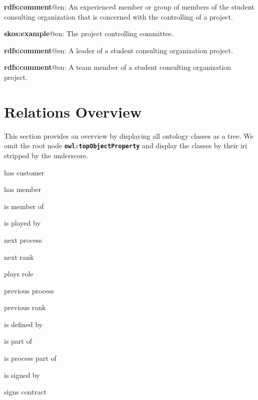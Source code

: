 \documentclass[a4paper, DIV=13, BCOR=0cm]{scrbook}
\newcommand{\class}[1]{\texttt{\textbf{#1}}}
\begin{document}
\begin{mdframed}[style=onto-3, frametitle={Project Controlling}]
	{%
		\begin{compactitem}
			\item \textbf{rdfs:comment}@en: An experienced member or group of members of the student consulting organization that is concerned with the controlling of a project.
			\item \textbf{skos:example}@en: The project controlling committee.
		\end{compactitem}
	} %
\end{mdframed}

\begin{mdframed}[style=onto-3, frametitle={Project Team Leader}]
	{%
		\begin{compactitem}
			\item \textbf{rdfs:comment}@en: A leader of a student consulting organization project.
		\end{compactitem}
	} %
\end{mdframed}

\begin{mdframed}[style=onto-3, frametitle={Project Team Member}]
	{%
		\begin{compactitem}
			\item \textbf{rdfs:comment}@en: A team member of a student consulting organization project.
		\end{compactitem}
	} %
\end{mdframed}


\section{Relations Overview}
This section provides an overview by displaying all ontology classes as a tree. We omit the root node \class{owl:topObjectProperty} and display the classes by their \gls{iri} stripped by the underscore.

\begin{compactitem}
	\item has customer
	\item has member
	\item is member of
	\item is played by
	\item next process
	\item next rank
	\item plays role
	\item previous process
	\item previous rank
	\item is defined by
	\item is part of
	\item is process part of
	\item is signed by
	\item signs contract
\end{compactitem}
\end{document}

